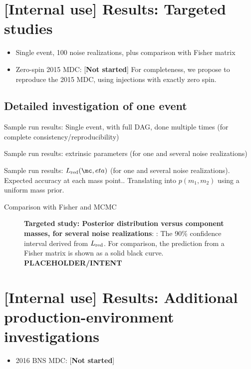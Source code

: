 \section{[Internal use] Results: Targeted studies}

\begin{itemize}
\item Single event, 100 noise realizations, plus comparison with Fisher matrix

\item Zero-spin 2015 MDC: [\textbf{Not started}]  For completeness, we propose to reproduce the 2015 MDC,  using
  injections with exactly zero spin.

\end{itemize}

\subsection{Detailed investigation of one event}
Sample run results: Single event, with full DAG, done multiple times (for complete consistency/reproducibility)

Sample run results: extrinsic parameters (for one and several noise realizations)

Sample run results: $L_{\rm red}(\mc,eta)$ (for one and several noise realizations). Expected accuracy at each mass
point.. Translating into  $p(m_1,m_2)$ using a uniform mass prior.

Comparison with Fisher and MCMC


\begin{figure}
\caption{\label{fig:TargetedEvent:LikelihoodVersusMchirpEta}\textbf{Targeted study: Posterior distribution
    versus component masses, for several noise realizations}: : The 90\% confidence interval derived from $L_{\rm red}$.  For
comparison, the prediction from a Fisher matrix is shown as a solid black curve.
 \textbf{PLACEHOLDER/INTENT}
}
\end{figure}


\section{[Internal use] Results: Additional production-environment investigations}

\begin{itemize}
\item 2016 BNS MDC: [\textbf{Not started}]

\end{itemize}

